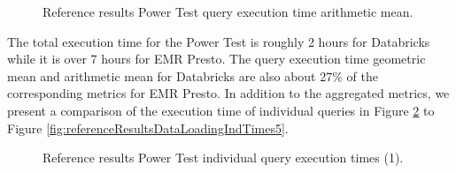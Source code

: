 \begin{figure}
   \begin{center}
   \end{center}
   \caption{Reference results Power Test query execution time arithmetic mean.}
   \label{fig:referenceResultsPowerTestArithmeticMean}
\end{figure}

The total execution time for the Power Test is roughly 2 hours for Databricks while it is over 7 hours for EMR Presto. The query execution time geometric mean and arithmetic mean for Databricks are also about 27\% of the corresponding metrics for EMR Presto. In addition to the aggregated metrics, we present a comparison of the execution time of individual queries in Figure \ref{fig:referenceResultsDataLoadingIndTimes1} to Figure \ref{fig:referenceResultsDataLoadingIndTimes5}.

\begin{figure}
   \begin{center}
   \end{center}
   \caption{Reference results Power Test individual query execution times (1).}
   \label{fig:referenceResultsDataLoadingIndTimes1}
\end{figure}

